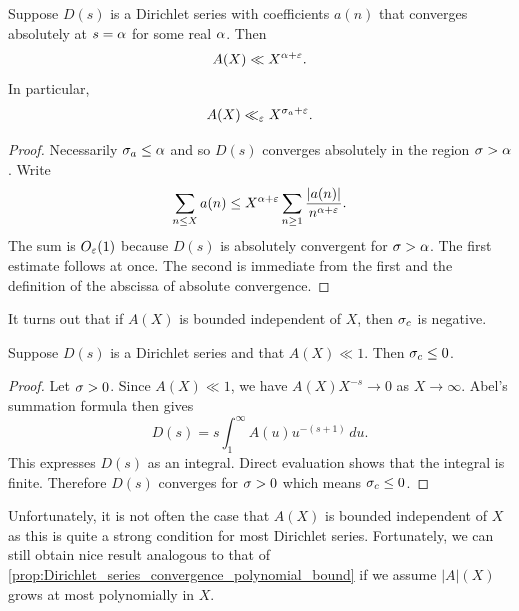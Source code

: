 \documentclass[12pt]{article}
\begin{document}
    \begin{proposition}\label{prop:Dirichlet_series_coefficient_size_on_average}
      Suppose \(D(s)\) is a Dirichlet series with coefficients \(a(n)\) that converges absolutely at \(s = \alpha\) for some real \(\alpha\). Then
      \[
        A(X) \ll X^{\alpha+\varepsilon}.
      \]
      In particular,
      \[
        A(X) \ll_{\varepsilon} X^{\sigma_{a}+\varepsilon}.
      \]
    \end{proposition}
    \begin{proof}
      Necessarily \(\sigma_{a} \le \alpha\) and so \(D(s)\) converges absolutely in the region \(\sigma > \alpha\). Write
      \[
        \sum_{n \le X}a(n) \le X^{\alpha+\varepsilon}\sum_{n \ge 1}\frac{|a(n)|}{n^{\alpha+\varepsilon}}.
      \]
      The sum is \(O_{\varepsilon}(1)\) because \(D(s)\) is absolutely convergent for \(\sigma > \alpha\). The first estimate follows at once. The second is immediate from the first and the definition of the abscissa of absolute convergence.
    \end{proof}
    
    It turns out that if \(A(X)\) is bounded independent of \(X\), then \(\sigma_{c}\) is negative.
    
    \begin{proposition}\label{prop:Dirichlet_series_convergence_bounded_coefficient_sum}
      Suppose \(D(s)\) is a Dirichlet series and that \(A(X) \ll 1\). Then \(\sigma_{c} \le 0\).
    \end{proposition}
    \begin{proof}
      Let \(\sigma > 0\). Since \(A(X) \ll 1\), we have \(A(X)X^{-s} \to 0\) as \(X \to \infty\). Abel's summation formula then gives
      \[
        D(s) = s\int_{1}^{\infty}A(u)u^{-(s+1)}\,du.
      \]
      This expresses \(D(s)\) as an integral. Direct evaluation shows that the integral is finite. Therefore \(D(s)\) converges for \(\sigma > 0\) which means \(\sigma_{c} \le 0\).
    \end{proof}

    Unfortunately, it is not often the case that \(A(X)\) is bounded independent of \(X\) as this is quite a strong condition for most Dirichlet series. Fortunately, we can still obtain nice result analogous to that of \cref{prop:Dirichlet_series_convergence_polynomial_bound} if we assume \(|A|(X)\) grows at most polynomially in \(X\).
\end{document}
